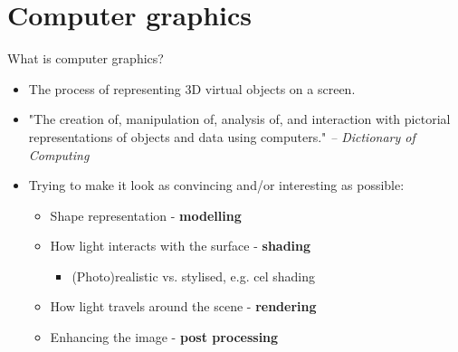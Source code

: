 \part{Computer graphics}
\frame{\partpage}

\begin{frame}{What is computer graphics?}
	\begin{itemize}
		\pause\item The process of representing 3D virtual objects on a screen.
		\pause\item "The creation of, manipulation of, analysis of, and interaction with pictorial representations of objects and data using computers." \textit{-- Dictionary of Computing}
		\pause\item Trying to make it look as convincing and/or interesting as possible:
		\begin{itemize}
			\pause\item Shape representation - \textbf{modelling}
			\pause\item How light interacts with the surface - \textbf{shading}
			\begin{itemize}
				\pause\item (Photo)realistic vs. stylised, e.g. cel shading
			\end{itemize}
			\pause\item How light travels around the scene - \textbf{rendering}
			\pause\item Enhancing the image - \textbf{post processing}
		\end{itemize}
	\end{itemize}
\end{frame}


